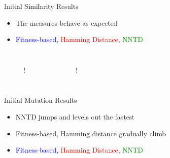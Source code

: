 \begin{frame}{Initial Similarity Results}
  \begin{itemize}
    \item The measures behave as expected
    \item \textcolor{blue}{Fitness-based}, \textcolor{red}{Hamming Distance}, \textcolor{green}{NNTD}
  \end{itemize}

  \begin{columns}
    \begin{figure}
      \centering
      \resizebox{\linewidth} {!} {%
        
      }
    \end{figure}
    \begin{figure}
      \centering
      \resizebox{\linewidth} {!} {%
        
      }
    \end{figure}
  \end{columns}

\end{frame}


\begin{frame}{Initial Mutation Results}
  \begin{itemize}
    \item NNTD jumps and levels out the fastest
    \item Fitness-based, Hamming distance gradually climb
    \item \textcolor{blue}{Fitness-based}, \textcolor{red}{Hamming Distance}, \textcolor{green}{NNTD}
  \end{itemize}

  \begin{columns}
    \begin{figure}
      \centering
    \end{figure}
    \begin{figure}
      \centering
    \end{figure}
  \end{columns}
\end{frame}



